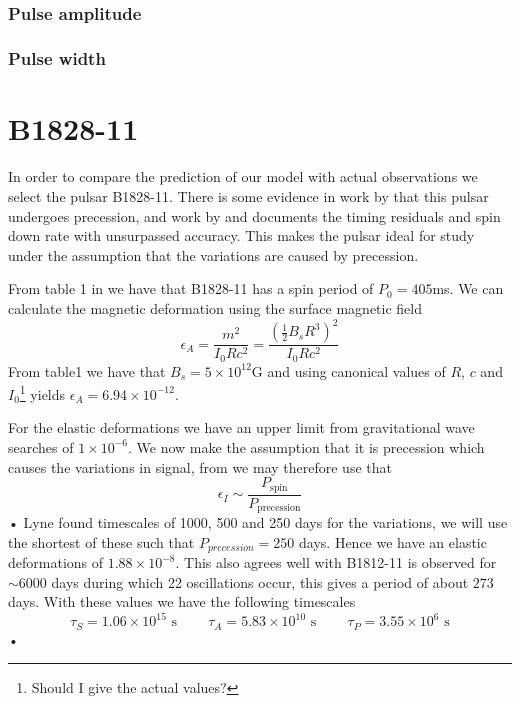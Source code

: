 \documentclass[/home/greg/Thesis/main/main.tex]{subfiles}
\begin{document}
\begin{figure}[ht]
\centering
	 \\
\caption{}
\label{fig:nu_dot no torque}
\end{figure}

\FloatBarrier

\subsubsection{Pulse amplitude}

\subsubsection{Pulse width}


\FloatBarrier
\section{B1828-11}
In order to compare the prediction of our model with actual observations we select the pulsar B1828-11. There is some evidence in work by \cite{Lyne2000} that this pulsar undergoes precession,  and work by \cite{Hobbs2010} and \cite{Lyne2010} documents the timing residuals and spin down rate with unsurpassed accuracy. This makes the pulsar ideal for study under the assumption that the variations are caused by precession.

From table 1 in \citet{Lyne2000} we have that B1828-11 has  a spin period of $P_{0}=405$ms. We can calculate the magnetic deformation using the surface magnetic field 
\begin{equation}
\epsilon_{A}=\frac{m^{2}}{I_{0}Rc^{2}}=\frac{(\frac{1}{2}B_{s}R^{3})^{2}}{I_{0}Rc^{2}}
\end{equation}
From table1 we have that $B_{s}=5\times10^{12}$G and using canonical values of $R$, $c$ and $I_{0}$\footnote{Should I give the actual values?} yields $\epsilon_{A}=6.94\times10^{-12}$.

For the elastic deformations we have an upper limit from gravitational wave searches of $1\times10^{-6}$. We now make the assumption that it is precession which causes the variations in signal, from \citet{Jones2001} we may therefore use that 
\begin{equation}
\epsilon_{I} \sim  \frac{P_{\textrm{spin}}}{P_{\textrm{precession}}}
\end{equation}•
Lyne found timescales of 1000, 500 and 250 days for the variations, we will use the shortest of these such that $P_{precession}=250$ days. Hence we have an elastic deformations of $1.88 \times10^{-8}$. This also agrees well with \citet{Lyne2010} B1812-11 is observed for $\sim6000$ days during which 22 oscillations occur, this gives a period of about $273$ days. 
With these values we have the following timescales
\begin{equation*}
\tau_{S}=1.06\times10^{15} \textrm{ s} \;\;\;\; \;\;\;\; \tau_{A}=5.83\times10^{10} \textrm{ s} \;\;\;\; \;\;\;\; \tau_{P}=3.55\times10^{6} \textrm{ s}
\end{equation*}•
\end{document}
